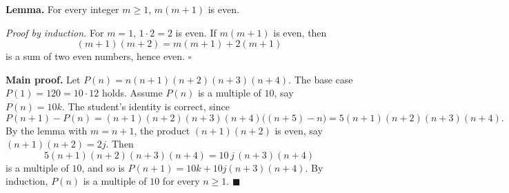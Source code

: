 \textbf{Lemma.} For every integer $m\ge1$, $m(m+1)$ is even.

\emph{Proof by induction.} For $m=1$, $1\cdot2=2$ is even. If $m(m+1)$ is even, then
\[(m+1)(m+2)=m(m+1)+2(m+1)\]
is a sum of two even numbers, hence even. $\square$

\textbf{Main proof.} Let $P(n)=n(n+1)(n+2)(n+3)(n+4)$. The base case $P(1)=120=10\cdot12$ holds. Assume $P(n)$ is a multiple of $10$, say $P(n)=10k$. The student's identity is correct, since
\[P(n+1)-P(n)=(n+1)(n+2)(n+3)(n+4)\bigl((n+5)-n\bigr)=5(n+1)(n+2)(n+3)(n+4).\]
By the lemma with $m=n+1$, the product $(n+1)(n+2)$ is even, say $(n+1)(n+2)=2j$. Then
\[5(n+1)(n+2)(n+3)(n+4)=10\,j\,(n+3)(n+4)\]
is a multiple of $10$, and so is $P(n+1)=10k+10j(n+3)(n+4)$. By induction, $P(n)$ is a multiple of $10$ for every $n\ge1$. $\blacksquare$
